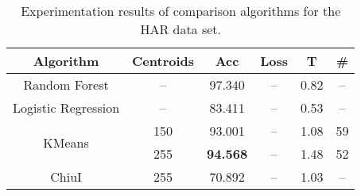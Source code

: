 \begin{table}[h!]
  \centering
\caption{Experimentation results of comparison algorithms for the HAR data set.}
\label{tab:har1}
\begin{tabular}{cccccc}
\hline
Algorithm & Centroids & Acc & Loss & T & \# \\ \hline
Random Forest & -- & 97.340 & -- & 0.82 & -- \\
Logistic Regression & --& 83.411 & -- & 0.53 & -- \\
\multirow{2}{*}{KMeans} & 150 & 93.001 & -- & 1.08 & 59 \\
& 255 & \textbf{94.568} & -- & 1.48 & 52\\
ChiuI & 255 & 70.892 & -- & 1.03 & -- \\
\end{tabular}
\end{table}

